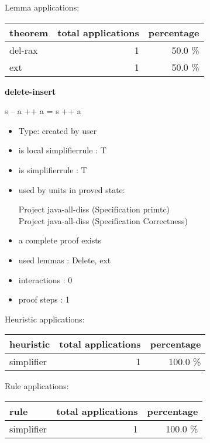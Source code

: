 \documentclass[a4paper]{article}
\begin{document}
Lemma applications:

\begin{supertabular}{l|r|r}
theorem	        & total applications & percentage \\ \hline
del-rax & 1 & 50.0 \% \\
ext & 1 & 50.0 \% \\

\end{supertabular}
\pagebreak

{\LARGE\bf delete-insert}\label{lemma-delete-insert}

\medskip

 \Fol s -- a ++ a = s ++ a

\begin{itemize}

\item Type: created by user

\item is local simplifierrule : T
\item is simplifierrule : T
\item used by units in proved state:

Project java-all-diss (Specification primtc) \\
Project java-all-diss (Specification Correctness)
\item       a complete proof exists
\item       used lemmas  : Delete, ext
\item       interactions : 0
\item       proof steps  : 1
\end{itemize}

\medskip


Heuristic applications:

\begin{supertabular}{l|r|r}
heuristic	& total applications & percentage \\ \hline
simplifier & 1 & 100.0 \% \\

\end{supertabular}

Rule applications:

\begin{supertabular}{l|r|r}
rule	        & total applications & percentage \\ \hline
simplifier & 1 & 100.0 \% \\

\end{supertabular}
\end{document}
